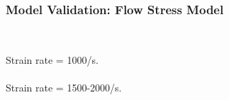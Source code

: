 \documentclass{beamer}
\begin{document}
    \begin{frame}
      \frametitle{Model Validation: Flow Stress Model}
      \begin{columns}[c]
        \begin{column}{5cm}
          \centering
           \\
          {\scriptsize Strain rate = 1000/s.}\\
          \vspace{12pt}
           \\
          {\scriptsize Strain rate = 1500-2000/s.}
        \end{column}

\end{columns}
\end{frame}
\end{document}
